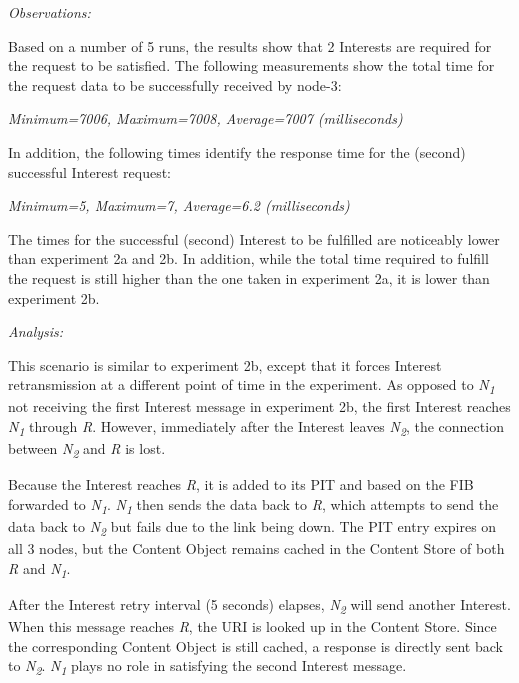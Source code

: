 \documentclass[a4paper,12pt]{report}      %
\begin{document}
\vspace*{1\baselineskip}\noindent\emph{Observations:}

Based on a number of 5 runs, the results show that 2 Interests are required for the request to be
satisfied. The following measurements show the total time for the request data to be successfully
received by node-3:

\begin{center}\textsl{Minimum=7006, Maximum=7008, Average=7007 (milliseconds)}\end{center}

In addition, the following times identify the response time for the (second) successful Interest request:

\begin{center}\textsl{Minimum=5, Maximum=7, Average=6.2 (milliseconds)}\end{center}

The times for the successful (second) Interest to be fulfilled are noticeably lower than experiment 2a
and 2b. In addition, while the total time required to fulfill the request is still higher than the one taken
in experiment 2a, it is lower than experiment 2b.

\vspace*{1\baselineskip}\noindent\emph{Analysis:}

This scenario is similar to experiment 2b, except that it forces Interest retransmission at a different
point of time in the experiment. As opposed to \emph{N\textsubscript{1}} not receiving the first Interest message
in experiment 2b, the first Interest reaches \emph{N\textsubscript{1}} through \emph{R}. However, immediately after the
Interest leaves \emph{N\textsubscript{2}}, the connection between \emph{N\textsubscript{2}} and \emph{R} is lost.

Because the Interest reaches \emph{R}, it is added to its PIT and based on the FIB forwarded to \emph{N\textsubscript{1}}.
\emph{N\textsubscript{1}} then sends the data back to \emph{R}, which attempts to send the data back to \emph{N\textsubscript{2}} but
fails due to the link being down. The PIT entry expires on all 3 nodes, but the Content Object
remains cached in the Content Store of both \emph{R} and \emph{N\textsubscript{1}}.

After the Interest retry interval (5 seconds) elapses, \emph{N\textsubscript{2}} will send another Interest. When this
message reaches \emph{R}, the URI is looked up in the Content Store. Since the corresponding Content
Object is still cached, a response is directly sent back to \emph{N\textsubscript{2}}. \emph{N\textsubscript{1}} plays no
 role in satisfying the second Interest message.
\end{document}

